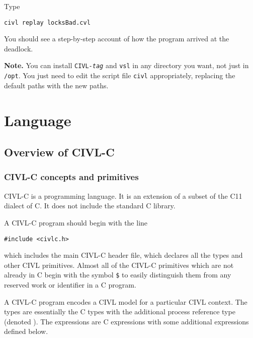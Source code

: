 \documentclass[11pt, oneside, letterpaper]{book}
\begin{document}
Type
\begin{verbatim}
civl replay locksBad.cvl
\end{verbatim}
You should see a step-by-step account of how the program arrived
at the deadlock.

\textbf{Note.}  You can install \texttt{CIVL-\textit{tag}} and
\texttt{vsl} in any directory you want, not just in \texttt{/opt}.
You just need to edit the script file \texttt{civl} appropriately,
replacing the default paths with the new paths.

\part{Language}

\chapter{Overview of CIVL-C}




\section{CIVL-C concepts and primitives}

CIVL-C is a programming language.  It is an extension of a subset of
the C11 dialect of C.  It does not include the standard C library.

A CIVL-C program should begin with the line
\begin{verbatim}
#include <civlc.h>
\end{verbatim}
which includes the main CIVL-C header file, which declares all the
types and other CIVL primitives.  Almost all of the CIVL-C primitives
which are not already in C begin with the symbol \texttt{\$} to easily
distinguish them from any reserved work or identifier in a C program.  

A CIVL-C program encodes a CIVL model for a particular CIVL
context. The types are essentially the C types with the additional
process reference type (denoted \cproc).  The expressions are C
expressions with some additional expressions defined below.
\end{document}
